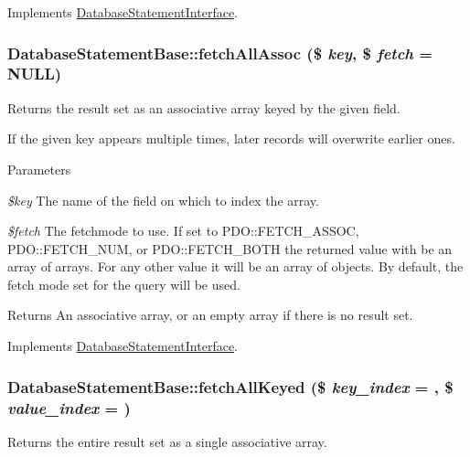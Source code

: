 Implements \hyperlink{interfaceDatabaseStatementInterface_a716e454a44a7667f7a90b90c1a6fe3eb}{DatabaseStatementInterface}.\hypertarget{classDatabaseStatementBase_a7ed7713a07605775cf41019d52b65f35}{
\subsubsection[{fetchAllAssoc}]{\setlength{\rightskip}{0pt plus 5cm}DatabaseStatementBase::fetchAllAssoc (\$ {\em key}, \/  \$ {\em fetch} = {\ttfamily NULL})}}
\label{classDatabaseStatementBase_a7ed7713a07605775cf41019d52b65f35}
Returns the result set as an associative array keyed by the given field.

If the given key appears multiple times, later records will overwrite earlier ones.


\begin{DoxyParams}{Parameters}
\item[{\em \$key}]The name of the field on which to index the array. \item[{\em \$fetch}]The fetchmode to use. If set to PDO::FETCH\_\-ASSOC, PDO::FETCH\_\-NUM, or PDO::FETCH\_\-BOTH the returned value with be an array of arrays. For any other value it will be an array of objects. By default, the fetch mode set for the query will be used.\end{DoxyParams}
\begin{DoxyReturn}{Returns}
An associative array, or an empty array if there is no result set. 
\end{DoxyReturn}


Implements \hyperlink{interfaceDatabaseStatementInterface_a8be68ba0a27dc2f5358c5bcf3243108b}{DatabaseStatementInterface}.\hypertarget{classDatabaseStatementBase_a1083f1060fd59bec06a7ae14dbc0b307}{
\subsubsection[{fetchAllKeyed}]{\setlength{\rightskip}{0pt plus 5cm}DatabaseStatementBase::fetchAllKeyed (\$ {\em key\_\-index} = {}, \/  \$ {\em value\_\-index} = {})}}
\label{classDatabaseStatementBase_a1083f1060fd59bec06a7ae14dbc0b307}
Returns the entire result set as a single associative array.

